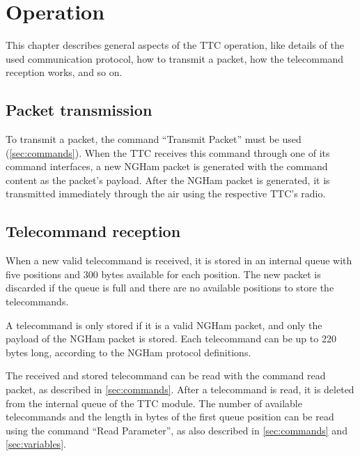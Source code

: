 %
%
%
%
%

%
%
%
%
%


\chapter{Operation}\label{ch:operation} \label{ch:operation}

This chapter describes general aspects of the TTC operation, like details of the used communication protocol, how to transmit a packet, how the telecommand reception works, and so on.

\section{Packet transmission}

    To transmit a packet, the command ``Transmit Packet'' must be used (\autoref{sec:commands}). When the TTC receives this command through one of its command interfaces, a new NGHam packet is generated with the command content as the packet's payload. After the NGHam packet is generated, it is transmitted immediately through the air using the respective TTC's radio.

\section{Telecommand reception}

When a new valid telecommand is received, it is stored in an internal queue with five positions and 300 bytes available for each position. The new packet is discarded if the queue is full and there are no available positions to store the telecommands.

A telecommand is only stored if it is a valid NGHam packet, and only the payload of the NGHam packet is stored. Each telecommand can be up to 220 bytes long, according to the NGHam protocol definitions.

The received and stored telecommand can be read with the command read packet, as described in \autoref{sec:commands}. After a telecommand is read, it is deleted from the internal queue of the TTC module. The number of available telecommands and the length in bytes of the first queue position can be read using the command ``Read Parameter'', as also described in \autoref{sec:commands} and \ref{sec:variables}.

